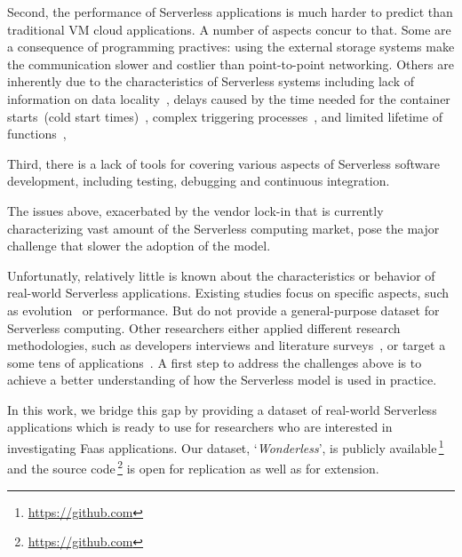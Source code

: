 Second, the performance of Serverless applications is much harder to 
predict than traditional VM cloud applications. A number of aspects concur to that.
Some are a consequence of programming practives:
using the external storage systems make the 
communication slower and costlier than point-to-point networking.
Others are inherently due to the characteristics of Serverless systems
including 
lack of information on data locality~\cite{DBLP:journals/corr/abs-1902-03383},
delays caused by the time needed 
for the container starts~(cold start times)~\cite{manner2018cold}, 
complex triggering processes~\cite{pelle2019towards}, and
limited lifetime of functions~\cite{hellerstein2018serverless}, 

Third, there is a lack of tools for covering various aspects of
Serverless software development, including testing, debugging 
and continuous integration\cite{lenarduzzi2020serverless}.
	
The issues above, exacerbated by the vendor lock-in that is currently 
characterizing vast amount of the Serverless computing market, 
pose the major challenge that slower the adoption of the \faas model. 

Unfortunatly, relatively little is known about the characteristics 
or behavior of real-world Serverless applications. Existing studies focus 
on specific aspects, such as evolution~\cite{spillner2019quantitative} 
or performance\cite{wang2018peeking,lloyd2018serverless}.
But do not provide a general-purpose dataset for Serverless computing.
Other researchers either applied different research methodologies, 
such as developers interviews and literature surveys~\cite{leitner2019mixed},
or target a some tens of applications~\cite{eismann2020serverless}.
A first step to address the challenges above is to achieve a 
better understanding of how the Serverless model is used in practice. 


In this work, we bridge this gap by providing a dataset of real-world Serverless 
applications which is ready to use for researchers who are interested in investigating
Faas applications. Our dataset, `\emph{Wonderless}', is publicly 
available\,\footnote{\url{https://github.com}} 
and the source code\,\footnote{\url{https://github.com}} 
is open for replication as well as for extension.











